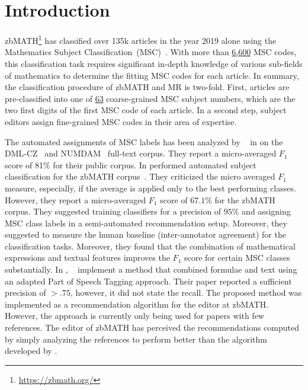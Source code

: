 \section{Introduction}\label{sec:intro}
zbMATH\footnote{\href{https://zbmath.org/}{{https://zbmath.org/}}} has classified over 135k articles in the year 2019 alone using the Mathematics Subject Classification~(MSC)~\cite{Khnemund2016}.
With more than \href{https://zbmath.org/classification/}{{6,600}} MSC codes, this classification task requires significant in-depth knowledge of various sub-fields of mathematics to determine the fitting MSC codes for each article.
In summary, the classification procedure of zbMATH and MR is two-fold.
First, articles are pre-classified into one of \href{https://msc2020.org}{{63}} coarse-grained MSC subject numbers, which are the two first digits of the first MSC code of each article.
In a second step, subject editors assign fine-grained MSC codes in their area of expertise.


The automated assignments of MSC labels has been analyzed by \citeauthor{RehurekS08}~\cite{RehurekS08} in \citeyear{RehurekS08} on the DML-CZ~\cite{SojkaR07} and NUMDAM~\cite{BoucheL17} full-text corpus.
They report a micro-averaged $F_1$ score of 81\% for their public corpus.
In \citeyear{BarthelTB13} \citeauthor{BarthelTB13} performed automated subject classification for the zbMATH corpus~\cite{BarthelTB13}.
They criticized the micro averaged $F_1$ measure, especially, if the average is applied only to the best performing classes. However, they report a micro-averaged $F_1$ score of $67.1\%$ for the zbMATH corpus.
They suggested training classifiers for a precision of $95\%$ and assigning MSC class labels in a  semi-automated recommendation setup.
Moreover, they suggested to measure the human baseline (inter-annotator agreement) for the classification tasks.
Moreover, they found that the combination of mathematical expressions and textual features improves the $F_1$ score for certain MSC classes substantially.
In \citeyear{SchonebergS14}, \citeauthor{SchonebergS14}~\cite{SchonebergS14} implement a method that combined formulae and text using an adapted Part of Speech Tagging approach.
Their paper reported a sufficient precision of $>.75$, however, it did not state the recall.
The proposed method was implemented as a recommendation algorithm for the editor at zbMATH.
However, the approach is currently only being used for papers with few references.
The editor of zbMATH has perceived the recommendations computed by simply analyzing the references to perform better than the algorithm developed by \citeauthor{SchonebergS14}.

